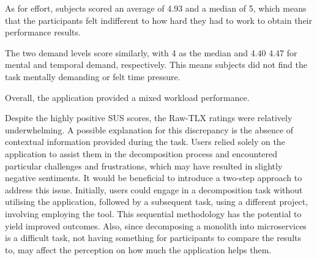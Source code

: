 As for effort, subjects scored an average of 4.93 and a median of 5, which
means that the participants felt indifferent to how hard they had to work to
obtain their performance results.

The two demand levels score similarly, with 4 as the median and 4.40 4.47 for
mental and temporal demand, respectively. This means subjects did not find the
task mentally demanding or felt time pressure.

Overall, the application provided a mixed workload performance.

Despite the highly positive SUS scores, the Raw-TLX ratings were relatively
underwhelming. A possible explanation for this discrepancy is the absence of
contextual information provided during the task. Users relied solely on the
application to assist them in the decomposition process and encountered
particular challenges and frustrations, which may have resulted in slightly
negative sentiments. It would be beneficial to introduce a two-step approach to
address this issue. Initially, users could engage in a decomposition task
without utilising the application, followed by a subsequent task, using a
different project, involving employing the tool. This sequential methodology
has the potential to yield improved outcomes. Also, since decomposing a
monolith into microservices is a difficult task, not having something for
participants to compare the results to, may affect the perception on how much
the application helps them.
